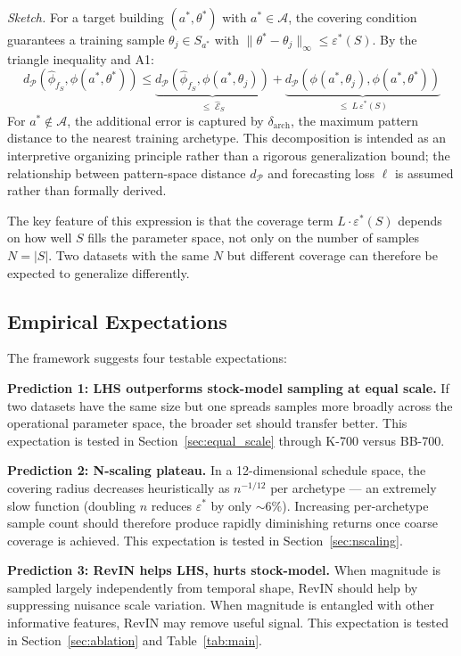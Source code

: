 \documentclass[preprint,12pt,authoryear]{elsarticle}
\begin{document}
\textit{Sketch.} For a target building $(a^*, \theta^*)$ with $a^* \in \mathcal{A}$, the covering condition guarantees a training sample $\theta_j \in S_{a^*}$ with $\|\theta^* - \theta_j\|_\infty \leq \varepsilon^*(S)$. By the triangle inequality and A1:
\begin{equation}
d_{\mathcal{P}}(\hat\phi_{f_S}, \phi(a^*,\theta^*)) \leq \underbrace{d_{\mathcal{P}}(\hat\phi_{f_S}, \phi(a^*,\theta_j))}_{\leq\;\hat{\mathcal{E}}_S} + \underbrace{d_{\mathcal{P}}(\phi(a^*,\theta_j), \phi(a^*,\theta^*))}_{\leq\;L\,\varepsilon^*(S)}
\end{equation}
For $a^* \notin \mathcal{A}$, the additional error is captured by $\delta_{\mathrm{arch}}$, the maximum pattern distance to the nearest training archetype. This decomposition is intended as an interpretive organizing principle rather than a rigorous generalization bound; the relationship between pattern-space distance $d_{\mathcal{P}}$ and forecasting loss $\ell$ is assumed rather than formally derived.

The key feature of this expression is that the coverage term $L \cdot \varepsilon^*(S)$ depends on how well $S$ fills the parameter space, not only on the number of samples $N = |S|$. Two datasets with the same $N$ but different coverage can therefore be expected to generalize differently.

\subsection{Empirical Expectations}

The framework suggests four testable expectations:

\textbf{Prediction 1: LHS outperforms stock-model sampling at equal scale.} If two datasets have the same size but one spreads samples more broadly across the operational parameter space, the broader set should transfer better. This expectation is tested in Section~\ref{sec:equal_scale} through K-700 versus BB-700.

\textbf{Prediction 2: N-scaling plateau.} In a 12-dimensional schedule space, the covering radius decreases heuristically as $n^{-1/12}$ per archetype --- an extremely slow function (doubling $n$ reduces $\varepsilon^*$ by only ${\sim}6\%$). Increasing per-archetype sample count should therefore produce rapidly diminishing returns once coarse coverage is achieved. This expectation is tested in Section~\ref{sec:nscaling}.

\textbf{Prediction 3: RevIN helps LHS, hurts stock-model.} When magnitude is sampled largely independently from temporal shape, RevIN should help by suppressing nuisance scale variation. When magnitude is entangled with other informative features, RevIN may remove useful signal. This expectation is tested in Section~\ref{sec:ablation} and Table~\ref{tab:main}.
\end{document}
